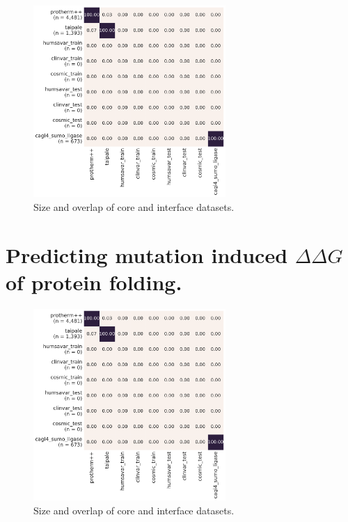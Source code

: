 \begin{figure}[ht!]
	\centering
	\includegraphics[width=0.65\textwidth]{static/elaspic_training_set/data_statistics/training_set_overlap_data_df_core.pdf}
	\caption[Size and overlap of core and interface datasets.]{Size and overlap of core and interface datasets.}
\end{figure}



\section{Predicting mutation induced $\Delta \Delta G$ of protein folding.}

\begin{figure}[ht!]
	\centering
	\includegraphics[width=0.65\textwidth]{static/elaspic_training_set/data_statistics/training_set_overlap_data_df_core.pdf}
	\caption[Core predictor datasets.]{Size and overlap of core and interface datasets.}
\end{figure}



